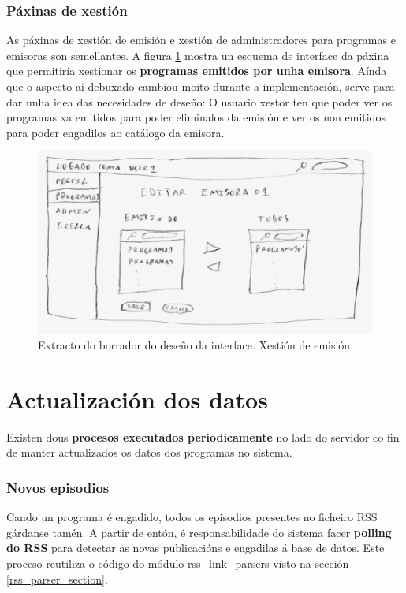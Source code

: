 \subsubsection{Páxinas de xestión}

As páxinas de xestión de emisión e xestión de administradores para programas e emisoras son semellantes. A figura \ref{fig:manage1_p} mostra un esquema de interface da páxina que permitiría xestionar os \textbf{programas emitidos por unha emisora}. Aínda que o aspecto aí debuxado cambiou moito durante a implementación, serve para dar unha idea das necesidades de deseño: O usuario xestor ten que poder ver os programas xa emitidos para poder eliminalos da emisión e ver os non emitidos para poder engadilos ao catálogo da emisora.


\begin{figure}[H]
	\centering
	\includegraphics[scale=0.2,keepaspectratio=true]{./images/manage1_p.png}
	\caption{Extracto do borrador do deseño da interface. Xestión de emisión.}
	\label{fig:manage1_p}
\end{figure}



\section{Actualización dos datos}
\label{daemon_desenho}

Existen dous \textbf{procesos executados periodicamente} no lado do servidor co fin de manter actualizados os datos dos programas no sistema.

\subsubsection{Novos episodios}

Cando un programa é engadido, todos os episodios presentes no ficheiro RSS gárdanse tamén. A partir de entón, é responsabilidade do sistema facer \textbf{polling do RSS} para detectar as novas publicacións e engadilas á base de datos. Este proceso reutiliza o código do módulo rss\_link\_parsers visto na sección \ref{rss_parser_section}.

